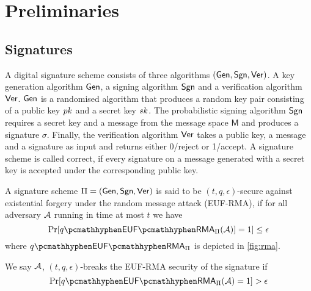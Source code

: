 \section{Preliminaries}\label{sec:preliminaries}








\subsection{Signatures}

A digital signature scheme consists of three algorithms $(\mathsf{Gen}, \mathsf{Sgn}, \mathsf{Ver})$. A key generation algorithm $\mathsf{Gen}$, a signing algorithm $\mathsf{Sgn}$ and a verification algorithm $\mathsf{Ver}$. $\mathsf{Gen}$ is a randomised algorithm that produces a random key pair consisting of a public key $pk$ and a secret key $sk$. The probabilistic signing algorithm $\mathsf{Sgn}$ requires a secret key and a message from the message space $\mathsf{M}$ and produces a signature $\sigma$. Finally, the verification algorithm $\mathsf{Ver}$ takes a public key, a message and a signature as input and returns either 0/reject or 1/accept. A signature scheme is called correct, if every signature on a message generated with a secret key is accepted under the corresponding public key.

\begin{definition}\label{def:rma}
A signature scheme $\Pi = (\mathsf{Gen}, \mathsf{Sgn}, \mathsf{Ver})$ is said to be $(t,q,\epsilon)$-secure against existential forgery under the random message attack (EUF-RMA), if for all adversary $\mathcal{A}$ running in time at most $t$ we have
$$\Pr[q\hyph\rma_{\Pi}(\adv)]=1] \leq \epsilon$$
where $q\hyph\rma_{\Pi}$ is depicted in \autoref{fig:rma}.


We say $\mathcal{A}$, $(t,q,\epsilon)$-breaks the EUF-RMA security of the signature if
$$\Pr[q\hyph\rma_{\Pi}(\adv)=1] > \epsilon$$
\end{definition}



